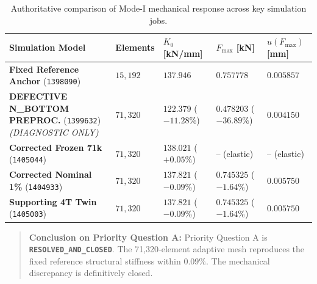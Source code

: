 \begin{table}[htbp]
  \centering
  \footnotesize
  \caption{Authoritative comparison of Mode-I mechanical response across key simulation jobs.}
  \label{tab:mode1_stiffness_summary}
  \begin{tabularx}{\textwidth}{L{48mm} C{18mm} C{22mm} C{22mm} C{22mm}}
    \toprule
    \textbf{Simulation Model} & \textbf{Elements} & $K_0$ \textbf{[kN/mm]} & $F_{\max}$ \textbf{[kN]} & $u(F_{\max})$ \textbf{[mm]} \\
    \midrule
    \textbf{Fixed Reference Anchor} (\texttt{1398090}) & $15{,}192$ & $137.946$ & $0.757778$ & $0.005857$ \\
    \textbf{DEFECTIVE N\_BOTTOM PREPROC.} (\texttt{1399632})\newline\textit{(DIAGNOSTIC ONLY)} & $71{,}320$ & $122.379$ ($-11.28\%$) & $0.478203$ ($-36.89\%$) & $0.004150$ \\
    \textbf{Corrected Frozen 71k} (\texttt{1405044}) & $71{,}320$ & $138.021$ ($+0.05\%$) & -- (elastic) & -- (elastic) \\
    \textbf{Corrected Nominal 1\%} (\texttt{1404933}) & $71{,}320$ & $137.821$ ($-0.09\%$) & $0.745325$ ($-1.64\%$) & $0.005750$ \\
    \textbf{Supporting 4T Twin} (\texttt{1405003}) & $71{,}320$ & $137.821$ ($-0.09\%$) & $0.745325$ ($-1.64\%$) & $0.005750$ \\
    \bottomrule
  \end{tabularx}
\end{table}

\begin{quote}
\textbf{Conclusion on Priority Question A:} Priority Question A is \textbf{\texttt{RESOLVED\_AND\_CLOSED}}. The 71,320-element adaptive mesh reproduces the fixed reference structural stiffness within $0.09\%$. The mechanical discrepancy is definitively closed.
\end{quote}
